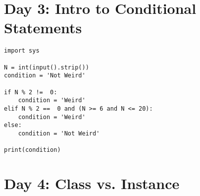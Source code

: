 \documentclass[11pt,a4paper]{article}
\begin{document}
\newpage
\section{Day 3: Intro to Conditional Statements}
\begin{lstlisting}
import sys

N = int(input().strip())
condition = 'Not Weird' 

if N % 2 !=  0:
    condition = 'Weird'
elif N % 2 ==  0 and (N >= 6 and N <= 20):
    condition = 'Weird'
else:
    condition = 'Not Weird' 

print(condition)        

\end{lstlisting}


\newpage
\section{Day 4: Class vs. Instance}
\end{document}
